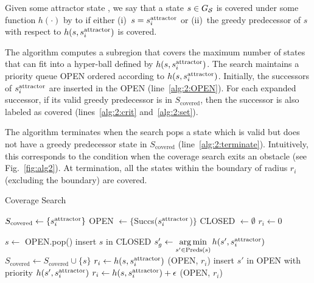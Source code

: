 \documentclass[a4paper]{report}
\begin{document}
\vspace{2mm}
\begin{definition}
  Given some attractor state \sAttract, we say that a state $s \in G_\mathcal{S}$ is covered under some function $h(\cdot)$ by to \sAttract if either
  (i)~$s = s^{\text{attractor}}_i$ or
  (ii)~the greedy predecessor of $s$ with respect to $h(s,s^{\text{attractor}}_i)$ is covered.
\end{definition}

The algorithm computes a subregion that covers the maximum number of states that can fit into a hyper-ball defined by $h(s,s^{\text{attractor}}_i)$. 
The search maintains a priority queue OPEN ordered according to $h(s,s^{\text{attractor}}_i)$. Initially, the successors of $s^{\text{attractor}}_i$ are inserted in the OPEN (line~\ref{alg:2:OPEN}). For each expanded successor, if its valid greedy predecessor is in $S_{\text{covered}}$, then the successor is also labeled as covered (lines~\ref{alg:2:crit} and~\ref{alg:2:set}). 

The algorithm terminates when the search pops a state which is valid but does not have a greedy predecessor state in $S_{\text{covered}}$ (line~\ref{alg:2:terminate}). Intuitively, this corresponds to  the condition when the coverage search exits an obstacle (see Fig.~\ref{fig:alg2}).
At termination, all the states within the boundary of radius $r_i$ (excluding the boundary) are covered.


\begin{algorithm}[t]
\caption{Coverage Search}\label{alg:2}

\begin{algorithmic}[1]
\State $S_{\text{covered}} \leftarrow \{s^{\text{attractor}}_i\}$  \label{alg:2:covered}
\State OPEN $\leftarrow \{$Succs($s^{\text{attractor}}_i$)$\}$   \label{alg:2:OPEN}
\State CLOSED $\leftarrow \emptyset$
\State $r_i \leftarrow 0$

    \State $s \leftarrow$ OPEN.pop()
    \State insert $s$ in CLOSED
    \State $s'_g \leftarrow \operatorname*{arg\,min}\limits_{s' \in \text{Preds}(s)} h(s', s^{\text{attractor}}_i)$ 
  \label{alg:2:greedy} 
      \label{alg:2:crit}
        \State $S_{\text{covered}} \leftarrow S_{\text{covered}} \cup \{s\}$   \label{alg:2:set}
     \label{alg:2:terminate}
        \State $r_i \leftarrow h(s, s^{\text{attractor}}_i)$ \label{alg:2:rad}
        \State \Return (OPEN, $r_i$)
    \EndIf
     \label{alg:2:prun}
            \State insert $s'$ in OPEN with priority $h(s', s^{\text{attractor}}_i)$
        \EndIf
    \EndFor
\EndWhile
\State $r_i \leftarrow h(s, s^{\text{attractor}}_i) + \epsilon$    
\State \Return (OPEN, $r_i$)

\EndProcedure
\end{algorithmic}
\end{algorithm}
\end{document}
